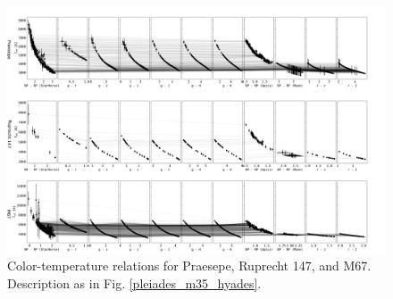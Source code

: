 \documentclass{aa}
\begin{document}
   \begin{figure}
		\centering
           \includegraphics[angle=90, width=0.8\hsize]{pics/clusters/praesepe_ngc6774_ngc2682.pdf}

      \caption{Color-temperature relations for Praesepe, Ruprecht 147, and M67. Description as in Fig. \ref{pleiades_m35_hyades}.}
         \label{praesepe_ngc6774_ngc2682}
   \end{figure}   
\end{document}
